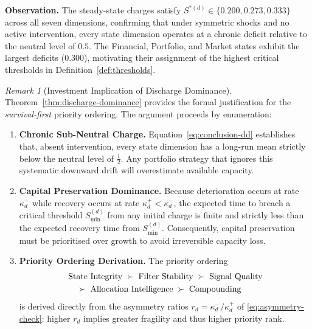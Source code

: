 \documentclass[12pt,openany]{book}
\numberwithin{equation}{chapter}
\theoremstyle{plain}
\theoremstyle{definition}
\theoremstyle{remark}
\newtheorem{remark}[theorem]{Remark}
\def\mathcal#1{#1}%
\begin{document}
\medskip
\noindent\textbf{Observation.}  The steady-state charges
satisfy $\mathcal{S}^{*(d)} \in \{0.200, 0.273, 0.333\}$ across
all seven dimensions, confirming that under symmetric shocks
and no active intervention, every state dimension operates at
a chronic deficit relative to the neutral level of $0.5$.
The Financial, Portfolio, and Market states exhibit the
largest deficits ($0.300$), motivating their assignment of
the highest critical thresholds in
Definition~\ref{def:thresholds}.

\begin{remark}[Investment Implication of Discharge Dominance]
\label{rem:discharge-implication}
Theorem~\ref{thm:discharge-dominance} provides the formal
justification for the \emph{survival-first} priority ordering.
The argument proceeds by enumeration:

\begin{enumerate}
  \item \textbf{Chronic Sub-Neutral Charge.}
    Equation~\eqref{eq:conclusion-dd} establishes that, absent
    intervention, every state dimension has a long-run mean
    strictly below the neutral level of $\tfrac{1}{2}$.
    Any portfolio strategy that ignores this systematic
    downward drift will overestimate available capacity.

  \item \textbf{Capital Preservation Dominance.}
    Because deterioration occurs at rate $\kappa_d^{-}$
    while recovery occurs at rate $\kappa_d^{+} < \kappa_d^{-}$,
    the expected time to breach a critical threshold
    $\mathcal{S}_{\min}^{(d)}$ from any initial charge is
    finite and strictly less than the expected recovery time
    from $\mathcal{S}_{\min}^{(d)}$.  Consequently, capital
    preservation must be prioritised over growth to avoid
    irreversible capacity loss.

  \item \textbf{Priority Ordering Derivation.}
    The priority ordering
    \begin{align}
      &\text{State Integrity}
      \;\succ\; \text{Filter Stability}
      \;\succ\; \text{Signal Quality} \notag \\
      &\quad\succ\; \text{Allocation Intelligence}
      \;\succ\; \text{Compounding}
      \label{eq:priority-ordering-1}
    \end{align}
    is derived directly from the asymmetry ratios
    $r_d = \kappa_d^{-}/\kappa_d^{+}$ of
    \eqref{eq:asymmetry-check}: higher $r_d$ implies greater
    fragility and thus higher priority rank.


\end{enumerate}
\end{remark}
\end{document}
